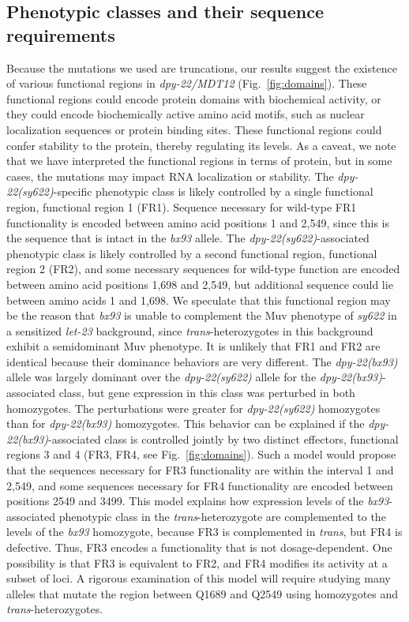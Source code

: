 \documentclass[9pt,twocolumn,twoside]{gsajnl}
\newcommand{\gene}[1]{\mbox{\emph{#1}}}
\newcommand{\dpy}[1]{\gene{dpy-22#1}}
\newcommand{\bx}{\dpy{(bx93)}}
\newcommand{\sy}{\dpy{(sy622)}}
\begin{document}
\subsection*{Phenotypic classes and their sequence requirements}
Because the mutations we used are truncations, our results suggest the existence
of various functional regions in \dpy{/MDT12} (Fig.~\ref{fig:domains}). These
functional regions could encode protein domains with biochemical activity, or
they could encode biochemically active amino acid motifs, such as nuclear
localization sequences or protein binding sites. These functional regions could
confer stability to the protein, thereby regulating its levels. As a caveat, we
note that we have interpreted the functional regions in terms of protein, but in
some cases, the mutations may impact RNA localization or stability. The
\sy{}-specific phenotypic class is likely controlled by a single functional
region, functional region 1 (FR1). Sequence necessary for wild-type FR1
functionality is encoded between amino acid positions 1 and 2,549, since this
is the sequence that is intact in the \emph{bx93} allele. The
\sy{}-associated phenotypic class is likely controlled by a second functional
region, functional region 2 (FR2), and some necessary sequences for wild-type
function are encoded between amino acid positions 1,698 and 2,549, but
additional sequence could lie between amino acids 1 and 1,698. We speculate that
this functional region may be the reason that \emph{bx93} is unable to
complement the Muv phenotype of \emph{sy622} in a sensitized \emph{let-23}
background, since \emph{trans}-heterozygotes in this background exhibit a
semidominant Muv phenotype. It is unlikely that FR1 and FR2 are identical
because their dominance behaviors are very different. The \bx{} allele was
largely dominant over the \sy{} allele for the \bx{}-associated class, but gene
expression in this class was perturbed in both homozygotes. The perturbations
were greater for \sy{} homozygotes than for \bx{} homozygotes. This behavior can
be explained if the \bx{}-associated class is controlled jointly by two distinct
effectors, functional regions 3 and 4 (FR3, FR4, see Fig.~\ref{fig:domains}).
Such a model would propose that the sequences necessary for FR3 functionality
are within the interval 1 and 2,549, and some sequences necessary for FR4
functionality are encoded between positions 2549 and 3499. This model explains
how expression levels of the \emph{bx93}-associated phenotypic class in the
\emph{trans}-heterozygote are complemented to the levels of the \emph{bx93}
homozygote, because FR3 is complemented in \emph{trans}, but FR4 is defective.
Thus, FR3 encodes a functionality that is not dosage-dependent. One possibility
is that FR3 is equivalent to FR2, and FR4 modifies its activity at a subset of
loci. A rigorous examination of this model will require studying many alleles
that mutate the region between Q1689 and Q2549 using homozygotes and
\emph{trans}-heterozygotes.
\end{document}
